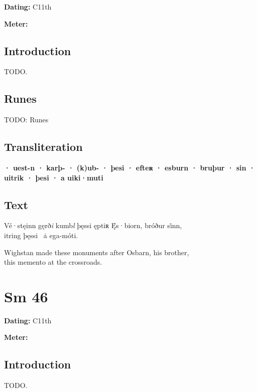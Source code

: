 \begin{flushright}%
\textbf{Dating:} C11th

\textbf{Meter:} \Fornyrdislag
\end{flushright}%

\subsection{Introduction}

TODO.

\subsection{Runes}

TODO: Runes%

\subsection{Transliteration}

\textbf{· uest-n · karþ- · (k)ub- · þesi · efteʀ · esburn · bruþur · sin · uitrik · þesi · a uiki·muti}

\subsection{Text}

\bpg\bpa[0]%
\startsub Vé·stęinn gęrð\emph{i} kumb\emph{l} þęssi ęptiʀ Ę̇s·biorn, bróður si̇nn,\endsub \\
itring þęssi \hld\ ȧ ega-móti.\epa

\bpb Wighstan made these monuments after Osbarn, his brother, \\
this memento at the crossroads.\epb\epg

\sectionline\clearpage


\section{Sm 46}

\begin{flushright}%
\textbf{Dating:} C11th

\textbf{Meter:} \Fornyrdislag
\end{flushright}%

\subsection{Introduction}

TODO.

